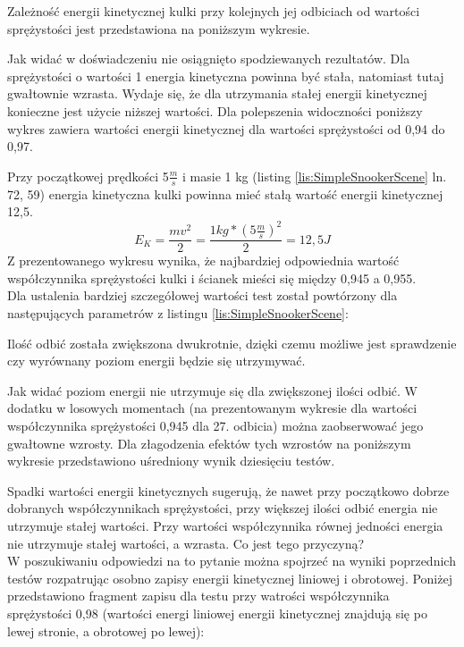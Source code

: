 Zależność energii kinetycznej kulki przy kolejnych jej odbiciach od wartości
sprężystości jest przedstawiona na poniższym wykresie.



Jak widać w doświadczeniu nie osiągnięto spodziewanych rezultatów. Dla
sprężystości o wartości 1 energia kinetyczna powinna być stała, natomiast tutaj
gwałtownie wzrasta. Wydaje się, że dla utrzymania stałej energii kinetycznej
konieczne jest użycie niższej wartości. Dla polepszenia widoczności poniższy
wykres zawiera wartości energii kinetycznej dla wartości sprężystości od 0,94 do
0,97.



Przy początkowej prędkości 5$\frac{m}{s}$ i masie 1 kg (listing
\ref{lis:SimpleSnookerScene} ln. 72, 59) energia kinetyczna kulki powinna mieć
stałą wartość energii kinetycznej 12,5.
\begin{equation}
E_{K} = \frac{mv^{2}}{2} = \frac{1kg*(5\frac{m}{s})^{2}}{2} =
12,5J
\end{equation}
Z prezentowanego wykresu wynika, że najbardziej odpowiednia wartość
współczynnika sprężystości kulki i ścianek mieści się między 0,945 a 0,955.\\
Dla ustalenia bardziej szczegółowej wartości test został powtórzony dla
następujących parametrów z listingu \ref{lis:SimpleSnookerScene}:


  
Ilość odbić została zwiększona dwukrotnie, dzięki czemu możliwe jest sprawdzenie
czy wyrównany poziom energii będzie się utrzymywać.
  


Jak widać poziom energii nie utrzymuje się dla zwiększonej ilości odbić. W
dodatku w losowych momentach (na prezentowanym wykresie dla wartości
współczynnika sprężystości 0,945 dla 27. odbicia) można zaobserwować jego
gwałtowne wzrosty. Dla złagodzenia efektów tych wzrostów na poniższym wykresie
przedstawiono uśredniony wynik dziesięciu testów.



Spadki wartości energii kinetycznych sugerują, że nawet przy początkowo dobrze
dobranych współczynnikach sprężystości, przy większej ilości odbić energia nie
utrzymuje stałej wartości. Przy wartości współczynnika równej jedności energia
nie utrzymuje stałej wartości, a wzrasta. Co jest tego przyczyną? \\
W poszukiwaniu odpowiedzi na to pytanie można spojrzeć na wyniki poprzednich
testów rozpatrując osobno zapisy energii kinetycznej liniowej i obrotowej.
Poniżej przedstawiono fragment zapisu dla testu przy watrości współczynnika
sprężystości 0,98 (wartości energi liniowej energii kinetycznej znajdują się
po lewej stronie, a obrotowej po lewej):

